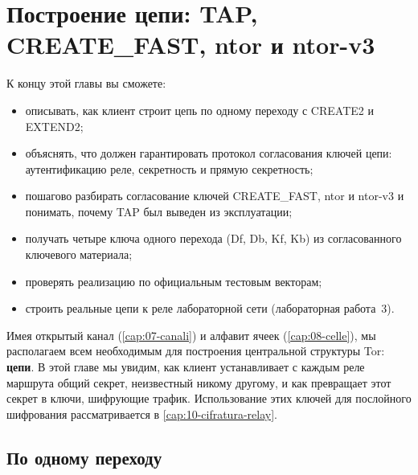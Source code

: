 \chapter{Построение цепи: TAP, CREATE\_FAST, ntor и ntor-v3}\label{cap:09-circuiti}

\begin{obiettivi}
К концу этой главы вы сможете:
\begin{itemize}[nosep]
  \item описывать, как клиент строит цепь по одному переходу с CREATE2 и EXTEND2;
  \item объяснять, что должен гарантировать протокол согласования ключей цепи: аутентификацию реле, секретность и прямую секретность;
  \item пошагово разбирать согласование ключей CREATE\_FAST, ntor и ntor-v3 и понимать, почему TAP был выведен из эксплуатации;
  \item получать четыре ключа одного перехода (Df, Db, Kf, Kb) из согласованного ключевого материала;
  \item проверять реализацию по официальным тестовым векторам;
  \item строить реальные цепи к реле лабораторной сети (лабораторная работа~3).
\end{itemize}
\end{obiettivi}

Имея открытый канал (\cref{cap:07-canali}) и алфавит ячеек (\cref{cap:08-celle}), мы располагаем всем необходимым для построения центральной структуры Tor: \textbf{цепи}. В этой главе мы увидим, как клиент устанавливает с каждым реле маршрута общий секрет, неизвестный никому другому, и как превращает этот секрет в ключи, шифрующие трафик. Использование этих ключей для послойного шифрования рассматривается в \cref{cap:10-cifratura-relay}.

\section{По одному переходу}\label{sec:circ-telescopio}

